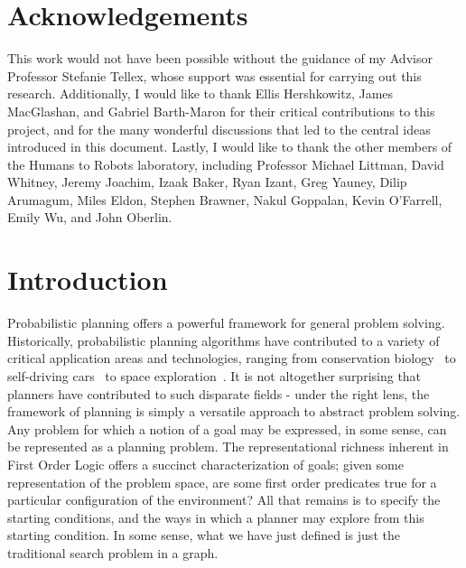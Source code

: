 \documentclass[11pt]{article}
\begin{document}
\newpage

\section*{Acknowledgements}
This work would not have been possible without the guidance of my Advisor Professor Stefanie Tellex, whose support was essential for carrying out this research. Additionally, I would like to thank Ellis Hershkowitz, James MacGlashan, and Gabriel Barth-Maron for their critical contributions to this project, and for the many wonderful discussions that led to the central ideas introduced in this document. Lastly, I would like to thank the other members of the Humans to Robots laboratory, including Professor Michael Littman, David Whitney, Jeremy Joachim, Izaak Baker, Ryan Izant, Greg Yauney, Dilip Arumagum, Miles Eldon, Stephen Brawner, Nakul Goppalan, Kevin O'Farrell, Emily Wu, and John Oberlin.

\newpage
\tableofcontents
\newpage

\section{Introduction}
\label{sec:introduction}

Probabilistic planning offers a powerful framework for general problem solving. Historically, probabilistic planning algorithms have contributed to a variety of critical application areas and technologies, ranging from conservation biology~\cite{possingham1997state} to self-driving cars~\cite{thrun2006stanley,montemerlo2008junior} to space exploration~\cite{bresina2005activity,backes1999automated,chien2000aspen}. It is not altogether surprising that planners have contributed to such disparate fields - under the right lens, the framework of planning is simply a versatile approach to abstract problem solving. Any problem for which a notion of a goal may be expressed, in some sense, can be represented as a planning problem. The representational richness inherent in First Order Logic offers a succinct characterization of goals; given some representation of the problem space, are some first order predicates true for a particular configuration of the environment? All that remains is to specify the starting conditions, and the ways in which a planner may explore from this starting condition. In some sense, what we have just defined is just the traditional search problem in a graph.
\end{document}

